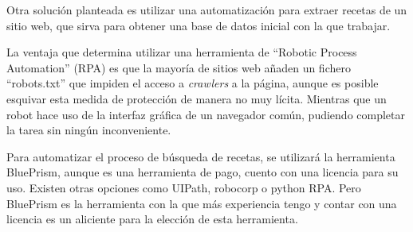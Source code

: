 Otra solución planteada es utilizar una automatización para extraer recetas de un sitio web, que sirva para obtener una base de datos inicial con la que trabajar. 

La ventaja que determina utilizar una herramienta de ``Robotic Process Automation'' (RPA) es que la mayoría de sitios web añaden un fichero ``robots.txt'' que impiden el acceso a \textit{\gls{crawlers}} a la página, aunque es posible esquivar esta medida de protección de manera no muy lícita. Mientras que un robot hace uso de la interfaz gráfica de un navegador común, pudiendo completar la tarea sin ningún inconveniente.

Para automatizar el proceso de búsqueda de recetas, se utilizará la herramienta BluePrism, aunque es una herramienta de pago, cuento con una licencia para su uso. Existen otras opciones como UIPath, robocorp o python RPA. Pero BluePrism es la herramienta con la que más experiencia tengo y contar con una licencia es un aliciente para la elección de esta herramienta. 